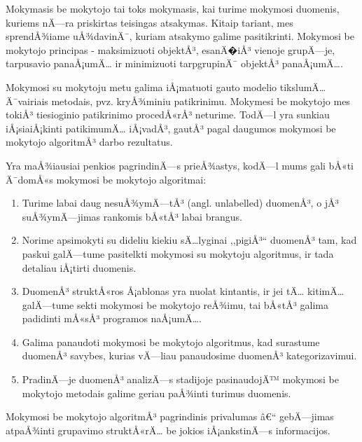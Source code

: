 Mokymasis be mokytojo tai toks mokymasis, kai turime mokymosi duomenis, kuriems
nÄ—ra priskirtas teisingas atsakymas. Kitaip tariant, mes sprendÅ¾iame
uÅ¾davinÄ¯, kuriam atsakymo galime pasitikrinti. Mokymosi be mokytojo principas - 
maksimizuoti objektÅ³, esanÄ�iÅ³ vienoje grupÄ—je, tarpusavio panaÅ¡umÄ… ir 
minimizuoti tarpgrupinÄ¯ objektÅ³ panaÅ¡umÄ….

Mokymosi su mokytoju metu galima iÅ¡matuoti gauto modelio tikslumÄ… Ä¯vairiais metodais, pvz.
kryÅ¾miniu patikrinimu. Mokymesi be mokytojo mes tokiÅ³ tiesioginio patikrinimo
procedÅ«rÅ³ neturime. TodÄ—l yra sunkiau iÅ¡siaiÅ¡kinti patikimumÄ… iÅ¡vadÅ³, gautÅ³ pagal
daugumos mokymosi be mokytojo algoritmÅ³ darbo rezultatus. 

Yra maÅ¾iausiai penkios pagrindinÄ—s prieÅ¾astys, kodÄ—l mums gali bÅ«ti Ä¯domÅ«s
mokymosi be mokytojo algoritmai:

\begin{enumerate}
	\item Turime labai daug nesuÅ¾ymÄ—tÅ³ (angl. unlabelled) duomenÅ³, o jÅ³
	suÅ¾ymÄ—jimas rankomis bÅ«tÅ³ labai brangus. 
	\item Norime apsimokyti su dideliu kiekiu sÄ…lyginai ,,pigiÅ³`` duomenÅ³ tam,
	kad paskui galÄ—tume	pasitelkti mokymosi su mokytoju algoritmus, ir tada
	detaliau iÅ¡tirti duomenis.
	\item DuomenÅ³ struktÅ«ros Å¡ablonas yra nuolat kintantis, ir jei tÄ… kitimÄ…
	galÄ—tume sekti mokymosi be mokytojo reÅ¾imu, tai bÅ«tÅ³ galima padidinti 
	mÅ«sÅ³ programos naÅ¡umÄ….
	\item Galima panaudoti mokymosi be mokytojo algoritmus, kad surastume
	duomenÅ³ savybes, kurias vÄ—liau panaudosime duomenÅ³ kategorizavimui.
	\item PradinÄ—je duomenÅ³ analizÄ—s stadijoje pasinaudojÄ™ mokymosi be mokytojo
	metodais galime geriau paÅ¾inti turimus duomenis.
\end{enumerate}

Mokymosi be mokytojo algoritmÅ³ pagrindinis privalumas â€“ gebÄ—jimas atpaÅ¾inti grupavimo
struktÅ«rÄ… be jokios iÅ¡ankstinÄ—s informacijos.



